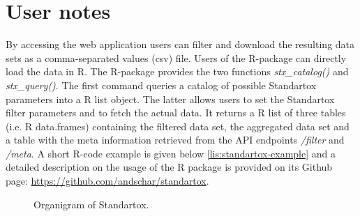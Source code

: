 \section{User notes}
By accessing the web application users can filter and download the resulting data sets as a comma-separated values (csv) file. Users of the R-package can directly load the data in R. The R-package provides the two functions \textit{stx\_catalog()} and \textit{stx\_query()}. The first command queries a catalog of possible Standartox parameters into a R list object. The latter allows users to set the Standartox filter parameters and to fetch the actual data. It returns a R list of three tables (i.e. R data.frames) containing the filtered data set, the aggregated data set and a table with the meta information retrieved from the API endpoints \textit{/filter} and \textit{/meta}. A short R-code example is given below \ref{lis:standartox-example} and a detailed description on the usage of the R package is provided on its Github page: \url{https://github.com/andschar/standartox}.



\begin{figure}[h]
    
    \caption{Organigram of Standartox.}
    \label{fig:stx-organigram}
\end{figure}


